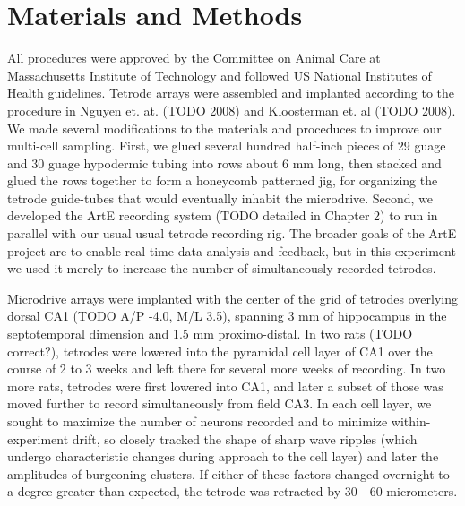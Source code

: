 \documentclass[10pt]{article}
\begin{document}
\section*{Materials and Methods}
All procedures were approved by the Committee on Animal Care at Massachusetts Institute of Technology and followed US National Institutes of Health guidelines. Tetrode arrays were assembled and implanted  according to the procedure in Nguyen et. at. (TODO 2008) and Kloosterman et. al (TODO 2008). We made several modifications to the materials and proceduces to improve our multi-cell sampling.  First, we glued several hundred half-inch pieces of 29 guage and 30 guage hypodermic tubing into rows about 6 mm long, then stacked and glued the rows together to form a honeycomb patterned jig, for organizing the tetrode guide-tubes that would eventually inhabit the microdrive. Second, we developed the ArtE recording system (TODO detailed in Chapter 2) to run in parallel with our usual usual tetrode recording rig. The broader goals of the ArtE project are to enable real-time data analysis and feedback, but in this experiment we used it merely to increase the number of simultaneously recorded tetrodes.

Microdrive arrays were implanted with the center of the grid of tetrodes overlying dorsal CA1 (TODO A/P -4.0, M/L 3.5), spanning 3 mm of hippocampus in the septotemporal dimension and 1.5 mm proximo-distal. In two rats (TODO correct?), tetrodes were lowered into the pyramidal cell layer of CA1 over the course of 2 to 3 weeks and left there for several more weeks of recording.  In two more rats, tetrodes were first lowered into CA1, and later a subset of those was moved further to record simultaneously from field CA3. In each cell layer, we sought to maximize the number of neurons recorded and to minimize within-experiment drift, so closely tracked the shape of sharp wave ripples (which undergo characteristic changes during approach to the cell layer) and later the amplitudes of burgeoning clusters. If either of these factors changed overnight to a degree greater than expected, the tetrode was retracted by 30 - 60 micrometers.
\end{document}
